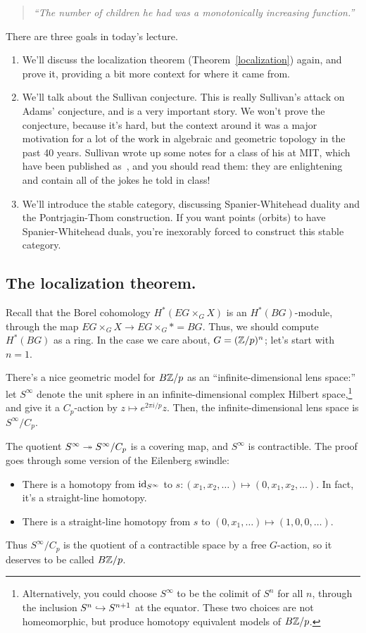 \begin{quote}\textit{
	``The number of children he had was a monotonically increasing function.''
}\end{quote}
There are three goals in today's lecture.
\begin{enumerate}
	\item We'll discuss the localization theorem (Theorem~\ref{localization}) again, and prove it, providing a bit
	more context for where it came from.
	\item We'll talk about the Sullivan conjecture. This is really Sullivan's attack on Adams' conjecture, and is a
	very important story. We won't prove the conjecture, because it's hard, but the context around it was a major
	motivation for a lot of the work in algebraic and geometric topology in the past 40 years. Sullivan wrote up
	some notes for a class of his at MIT, which have been published as~\cite{MITNotes}, and you should read them:
	they are enlightening and contain all of the jokes he told in class!
	\item We'll introduce the stable category, discussing Spanier-Whitehead duality and the Pontrjagin-Thom
	construction. If you want points (orbits) to have Spanier-Whitehead duals, you're inexorably forced to
	construct this stable category.
\end{enumerate}
\subsection*{The localization theorem.}
Recall that the Borel cohomology $H^*(EG\times_G X)$ is an $H^*(BG)$-module, through the map $EG\times_G X\to
EG\times_G * = BG$. Thus, we should compute $H^*(BG)$ as a ring. In the case we care about, $G = (\mathbb Z/p)^n$; let's
start with $n = 1$.

There's a nice geometric model for $B\mathbb Z/p$ as an ``infinite-dimensional lens space:'' let $S^\infty$ denote the
unit sphere in an infinite-dimensional complex Hilbert space,\footnote{Alternatively, you could choose $S^\infty$
to be the colimit of $S^n$ for all $n$, through the inclusion $S^n\hookrightarrow S^{n+1}$ at the equator. These two choices
are not homeomorphic, but produce homotopy equivalent models of $B\mathbb Z/p$.} and give it a $C_p$-action by $z\mapsto
e^{2\pi i/p}z$. Then, the infinite-dimensional lens space is $S^\infty/C_p$.

The quotient $S^\infty\twoheadrightarrow S^\infty/C_p$ is a covering map, and $S^\infty$ is contractible. The proof goes through
some version of the Eilenberg swindle:
\begin{itemize}
	\item There is a homotopy from $\mathrm{id}_{S^\infty}$ to $s: (x_1,x_2,\dotsc)\mapsto (0, x_1, x_2, \dotsc)$. In fact,
	it's a straight-line homotopy.
	\item There is a straight-line homotopy from $s$ to $(0,x_1,\dotsc)\mapsto (1, 0, 0,\dotsc)$.
\end{itemize}
Thus $S^\infty/C_p$ is the quotient of a contractible space by a free $G$-action, so it deserves to be called
$B\mathbb Z/p$.

